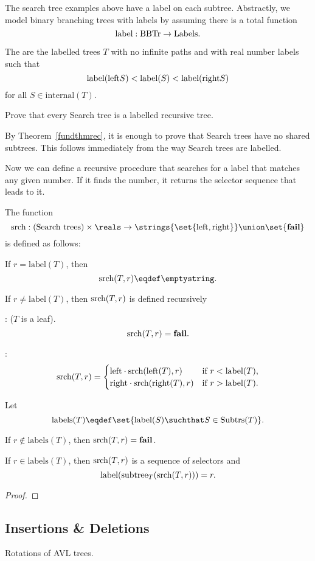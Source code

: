 The search tree examples above have a label on each subtree.
Abstractly, we model binary branching trees with labels by assuming
there is a total function
\[
\text{label}:\text{BBTr} \to \text{Labels}.
\]

\begin{definition}
The  are the labelled trees $T$ with no infinite
paths and with real number labels such that
\[
\text{label}(\text{left}S) < \text{label}(S) < \text{label}(\text{right}S)
\]
for all $S \in \text{internal}(T)$.
\end{definition}

\begin{problem}
Prove that every Search tree is a labelled recursive tree.

\begin{solution}
By Theorem~\ref{fundthmrec}, it is enough to prove that Search trees
have no shared subtrees.  This follows immediately from the way Search
trees are labelled.
\end{solution}
\end{problem}

Now we can define a recursive procedure that searches for a label that
matches any given number.  If it finds the number, it returns the
selector sequence that leads to it.

\begin{definition}

The function
\[
\srchtr{}: \text{(Search trees)} \times \reals \to
\strings{\set{\leftsub{},\rightsub{}}} \union \set{\textbf{fail}}
\]
is defined as follows:

If $r = \text{label}(T)$, then
\[
\srchtr{(T,r)} \eqdef \emptystring.
\]

If $r \neq \text{label}(T)$, then $\text{srch}(T,r)$ is defined recursively

: ($T$ is a leaf).
\[
\text{srch}(T,r) = \textbf{fail}.
\]

:
\[
\text{srch}(T,r) = \begin{cases} 
\text{left}\cdot \text{srch}(\text{left}(T),r) & \text{if $r < \text{label}(T)$},\\
\text{right}\cdot \text{srch}(\text{right}(T),r) & \text{if $r > \text{label}(T)$}.
\end{cases}
\]
\end{definition}

\begin{theorem}
Let
\[
\text{labels}(T) \eqdef \set{\text{label}(S) \suchthat S \in \subbrn{T}}.
\]

If $r \notin \text{labels}(T)$, then $\text{srch}(T,r) = \textbf{fail}$.  

If $r \in \text{labels}(T)$, then $\text{srch}(T,r)$ is a sequence of
selectors and
\[
\text{label}(\text{subtree}_{T}(\text{srch}(T,r))) = r.
\]
\end{theorem}

\begin{proof}


\end{proof}

\subsection{Insertions \& Deletions}

Rotations of AVL trees.


  \endinput
